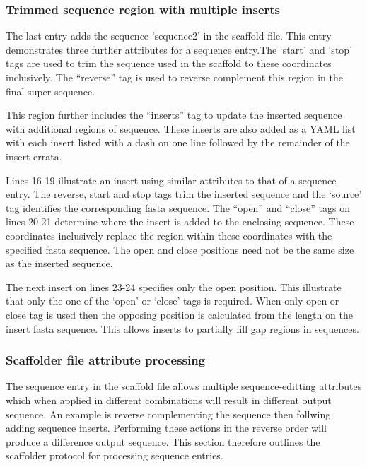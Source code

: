 \documentclass[10pt]{bmc_article}
\newenvironment{bmcformat}{\begin{raggedright}\baselineskip20pt\sloppy\setboolean{publ}{false}}{\end{raggedright}\baselineskip20pt\sloppy}
\begin{document}
\begin{bmcformat}
\subsubsection*{Trimmed sequence region with multiple inserts} %

The last entry adds the sequence 'sequence2' in the scaffold file. This entry
demonstrates three further attributes for a sequence entry.The `start' and
`stop' tags are used to trim the sequence used in the scaffold to these
coordinates inclusively. The ``reverse'' tag is used to reverse complement this
region in the final super sequence. \pb

This region further includes the ``inserts'' tag to update the inserted
sequence with additional regions of sequence. These inserts are also added as
a YAML list with each insert listed with a dash on one line followed by the
remainder of the insert errata. \pb

Lines 16-19 illustrate an insert using similar attributes to that of a sequence
entry. The reverse, start and stop tags trim the inserted sequence and the
`source' tag identifies the corresponding fasta sequence. The ``open'' and
``close'' tags on lines 20-21 determine where the insert is added to the
enclosing sequence.  These coordinates inclusively replace the region within
these coordinates with the specified fasta sequence. The open and close
positions need not be the same size as the inserted sequence. \pb

The next insert on lines 23-24 specifies only the open position. This
illustrate that only the one of the `open' or `close' tags is required.  When
only open or close tag is used then the opposing position is calculated from
the length on the insert fasta sequence. This allows inserts to partially fill
gap regions in sequences. \pb

\subsubsection*{Scaffolder file attribute processing} %

The sequence entry in the scaffold file allows multiple sequence-editting
attributes which when applied in different combinations will result in
different output sequence. An example is reverse complementing the sequence
then follwing adding sequence inserts. Performing these actions in the reverse
order will produce a difference output sequence. This section therefore
outlines the scaffolder protocol for processing sequence entries. \pb


\end{bmcformat}
\end{document}
